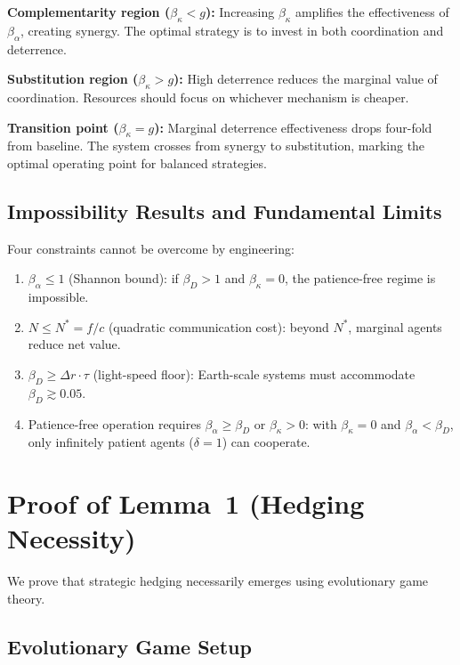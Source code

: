 \documentclass[11pt]{article}
\begin{document}
\textbf{Complementarity region ($\beta_\kappa < g$):} Increasing $\beta_\kappa$ amplifies the effectiveness of $\beta_\alpha$, creating synergy. The optimal strategy is to invest in both coordination and deterrence.

\textbf{Substitution region ($\beta_\kappa > g$):} High deterrence reduces the marginal value of coordination. Resources should focus on whichever mechanism is cheaper.

\textbf{Transition point ($\beta_\kappa = g$):} Marginal deterrence effectiveness drops four-fold from baseline. The system crosses from synergy to substitution, marking the optimal operating point for balanced strategies.

\subsection{Impossibility Results and Fundamental Limits}
\label{sec:S2.9}

Four constraints cannot be overcome by engineering:
\begin{enumerate}
\item $\beta_\alpha \leq 1$ (Shannon bound): if $\beta_D > 1$ and $\beta_\kappa = 0$, the patience-free regime is impossible.
\item $N \leq N^* = f/c$ (quadratic communication cost): beyond $N^*$, marginal agents reduce net value.
\item $\beta_D \geq \Delta r \cdot \tau$ (light-speed floor): Earth-scale systems must accommodate $\beta_D \gtrsim 0.05$.
\item Patience-free operation requires $\beta_\alpha \geq \beta_D$ or $\beta_\kappa > 0$: with $\beta_\kappa = 0$ and $\beta_\alpha < \beta_D$, only infinitely patient agents ($\delta = 1$) can cooperate.
\end{enumerate}


\section{Proof of Lemma~1 (Hedging Necessity)}
\label{sec:S3}

We prove that strategic hedging necessarily emerges using evolutionary game theory.

\subsection{Evolutionary Game Setup}
\label{sec:S3.1}
\end{document}
